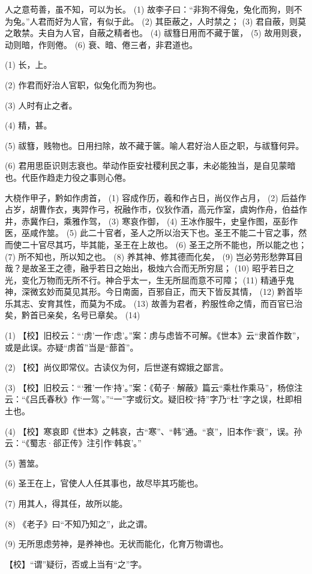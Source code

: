 \documentclass[12pt,UTF8]{ctexbook}
\begin{document}
人之意苟善，虽不知，可以为长。 (1) 故李子曰：“非狗不得兔，兔化而狗，则不为兔。”人君而好为人官，有似于此。 (2) 其臣蔽之，人时禁之； (3) 君自蔽，则莫之敢禁。夫自为人官，自蔽之精者也。 (4) 祓篲日用而不藏于箧， (5) 故用则衰，动则暗，作则倦。 (6) 衰、暗、倦三者，非君道也。

(1) 长，上。

(2) 作君而好治人官职，似兔化而为狗也。

(3) 人时有止之者。

(4) 精，甚。

(5) 祓篲，贱物也。日用扫除，故不藏于箧。喻人君好治人臣之职，与祓篲何异。

(6) 君用思臣识则志衰也。举动作臣安社稷利民之事，未必能独当，是自见蒙暗也。代臣作趋走力役之事则心倦。

大桡作甲子，黔如作虏首， (1) 容成作历，羲和作占日，尚仪作占月， (2) 后益作占岁，胡曹作衣，夷羿作弓，祝融作市，仪狄作酒，高元作室，虞姁作舟，伯益作井，赤冀作臼，乘雅作驾， (3) 寒哀作御， (4) 王冰作服牛，史皇作图，巫彭作医，巫咸作筮。 (5) 此二十官者，圣人之所以治天下也。圣王不能二十官之事，然而使二十官尽其巧，毕其能，圣王在上故也。 (6) 圣王之所不能也，所以能之也； (7) 所不知也，所以知之也。 (8) 养其神、修其德而化矣， (9) 岂必劳形愁弊耳目哉？是故圣王之德，融乎若日之始出，极烛六合而无所穷屈； (10) 昭乎若日之光，变化万物而无所不行。神合乎太一，生无所屈而意不可障； (11) 精通乎鬼神，深微玄妙而莫见其形。今日南面，百邪自正，而天下皆反其情， (12) 黔首毕乐其志、安育其性，而莫为不成。 (13) 故善为君者，矜服性命之情，而百官已治矣，黔首已亲矣，名号已章矣。 (14)

(1) 【校】旧校云：“‘虏’一作‘虑’。”案：虏与虑皆不可解。《世本》云“隶首作数”，或是此误。亦疑“虏首”当是“蔀首”。

(2) 【校】尚仪即常仪。古读仪为何，后世遂有嫦娥之鄙言。

(3) 【校】旧校云：“‘雅’一作‘持’。”案：《荀子·解蔽》篇云“乘杜作乘马”，杨倞注云：“《吕氏春秋》作‘一驾’。”“一”字或衍文。疑旧校“持”字乃“杜”字之误，杜即相土也。

(4) 【校】寒哀即《世本》之韩哀，古“寒”、“韩”通。“哀”，旧本作“衰”，误。孙云：“《蜀志·郤正传》注引作‘韩哀’。”

(5) 蓍筮。

(6) 圣王在上，官使人人任其事也，故尽毕其巧能也。

(7) 用其人，得其任，故所以能。

(8) 《老子》曰“不知乃知之”，此之谓。

(9) 无所思虑劳神，是养神也。无状而能化，化育万物谓也。

【校】“谓”疑衍，否或上当有“之”字。
\end{document}
